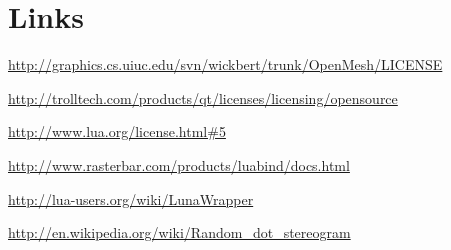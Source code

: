 \documentclass[11pt]{scrartcl}
\begin{document}
\appendix

\section{Links}
\url{http://graphics.cs.uiuc.edu/svn/wickbert/trunk/OpenMesh/LICENSE}

\url{http://trolltech.com/products/qt/licenses/licensing/opensource}

\url{http://www.lua.org/license.html#5}

\url{http://www.rasterbar.com/products/luabind/docs.html}

\url{http://lua-users.org/wiki/LunaWrapper}

\url{http://en.wikipedia.org/wiki/Random_dot_stereogram}
\end{document}
